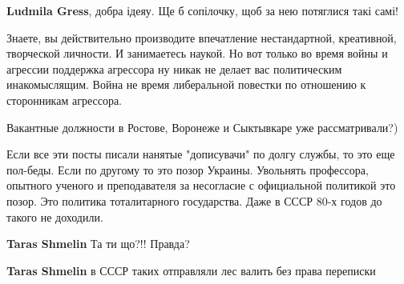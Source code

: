 \begin{itemize}
\begin{itemize}
\textbf{Ludmila Gress}, добра ідеяу. Ще б сопілочку, щоб за нею потяглися такі самі!
\end{itemize}

 
Знаете, вы действительно производите впечатление нестандартной, креативной,
творческой личности. И занимаетесь наукой. Но вот только во время войны и
агрессии поддержка агрессора ну никак не делает вас политическим инакомыслящим.
Война не время либеральной повестки по отношению к сторонникам агрессора.

 
Вакантные должности в Ростове, Воронеже и Сыктывкаре уже рассматривали?)

 

Если все эти посты писали нанятые "дописувачи" по долгу службы, то это еще
пол-беды. Если по другому то это позор Украины. Увольнять профессора, опытного
ученого и преподавателя за несогласие с официальной политикой это позор. Это
политика тоталитарного государства. Даже в СССР 80-х годов до такого не
доходили.

\begin{itemize}
 
\textbf{Taras Shmelin} Та ти що?!!
Правда?

 
\textbf{Taras Shmelin} в СССР таких отправляли лес валить без права переписки


\end{itemize}
\end{itemize}
